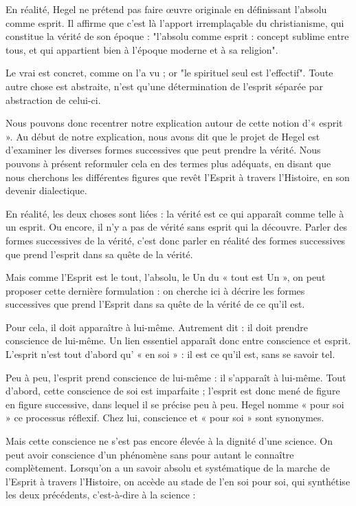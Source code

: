 En réalité, Hegel ne prétend pas faire œuvre originale en définissant l’absolu comme esprit. Il affirme que c’est là l’apport irremplaçable du christianisme, qui constitue la vérité de son époque : "l’absolu comme esprit : concept sublime entre tous, et qui appartient bien à l’époque moderne et à sa religion".

Le vrai est concret, comme on l’a vu ; or "le spirituel seul est l’effectif". Toute autre chose est abstraite, n’est qu’une détermination de l’esprit séparée par abstraction de celui-ci.

Nous pouvons donc recentrer notre explication autour de cette notion d’« esprit ». Au début de notre explication, nous avons dit que le projet de Hegel est d’examiner les diverses formes successives que peut prendre la vérité. Nous pouvons à présent reformuler cela en des termes plus adéquats, en disant que nous cherchons les différentes figures que revêt l’Esprit à travers l’Histoire, en son devenir dialectique.

En réalité, les deux choses sont liées : la vérité est ce qui apparaît comme telle à un esprit. Ou encore, il n’y a pas de vérité sans esprit qui la découvre. Parler des formes successives de la vérité, c’est donc parler en réalité des formes successives que prend l’esprit dans sa quête de la vérité.

Mais comme l’Esprit est le tout, l’absolu, le Un du « tout est Un », on peut proposer cette dernière formulation : on cherche ici à décrire les formes successives que prend l’Esprit dans sa quête de la vérité de ce qu’il est.

Pour cela, il doit apparaître à lui-même. Autrement dit : il doit prendre conscience de lui-même. Un lien essentiel apparaît donc entre conscience et esprit. L’esprit n’est tout d’abord qu’ « en soi » : il est ce qu’il est, sans se savoir tel.

Peu à peu, l’esprit prend conscience de lui-même : il s’apparaît à lui-même. Tout d’abord, cette conscience de soi est imparfaite ; l’esprit est donc mené de figure en figure successive, dans lequel il se précise peu à peu. Hegel nomme « pour soi » ce processus réflexif. Chez lui, conscience et « pour soi » sont synonymes.

Mais cette conscience ne s’est pas encore élevée à la dignité d’une science. On peut avoir conscience d’un phénomène sans pour autant le connaître complètement. Lorsqu’on a un savoir absolu et systématique de la marche de l’Esprit à travers l’Histoire, on accède au stade de l’en soi pour soi, qui synthétise les deux précédents, c’est-à-dire à la science :

